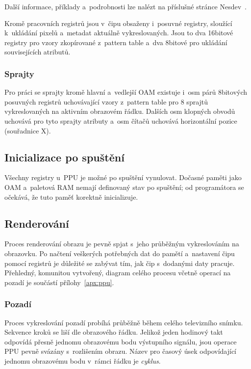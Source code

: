 Další informace, příklady a~podrobnosti lze nalézt na příslušné stránce Nesdev~\cite{Nesdev:ppu-scroll}.

Kromě pracovních registrů jsou v~čipu obsaženy i~posuvné registry, sloužící k~ukládání pixelů a~metadat aktuálně vykreslovaných. Jsou to dva 16bitové registry pro vzory zkopírované z~pattern table a~dva 8bitové pro ukládání souvisejících atributů.

\subsubsection{Sprajty}
Pro práci se sprajty kromě hlavní a~vedlejší OAM existuje i~osm párů 8bitových posuvných registrů uchovávající vzory z~pattern table pro 8 sprajtů vykreslovaných na aktivním obrazovém řádku. Dalších osm klopných obvodů uchovává pro tyto sprajty atributy a~osm čítačů uchovává horizontální pozice (souřadnice X).


\subsection{Inicializace po spuštění}
Všechny registry u~PPU je možné po spuštění vynulovat. Dočasné paměti jako OAM a~paletová RAM nemají definovaný stav po spuštění; od programátora se očekává, že tuto paměť korektně inicializuje.

\subsection{Renderování}
Proces renderování obrazu je pevně spjat s~jeho průběžným vykreslováním na obrazovku. Po načtení veškerých potřebných dat do pamětí a~nastavení čipu pomocí registrů je důležité se zabývat tím, jak čip s~dodanými daty pracuje. Přehledný, komunitou vytvořený, diagram celého procesu včetně operací na pozadí je součástí přílohy~\ref{apx:ppu}.

\subsubsection{Pozadí}
\label{sec:ppu-pozadi}
Proces vykreslování pozadí probíhá průběžně během celého televizního snímku. Sekvence kroků se liší dle obrazového řádku. Jelikož jeden hodinový takt odpovídá přesně jednomu obrazovému bodu výstupního signálu, jsou operace PPU pevně svázány s~rozlišením obrazu. Název pro časový úsek odpovídající jednomu obrazovému bodu v~rámci řádku je \emph{cyklus}.

